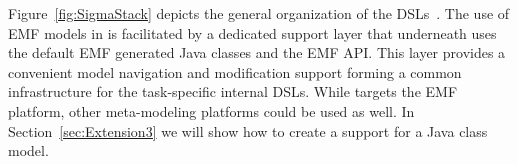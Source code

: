 Figure~\ref{fig:SigmaStack} depicts the general organization of the \SIGMA DSLs~\cite{Krikava2014}.
The use of EMF models in \SIGMA is facilitated by a dedicated support layer that underneath uses the default EMF generated Java classes and the EMF API.
This layer provides a convenient model navigation and modification support forming a common infrastructure for the task-specific internal DSLs.
While \SIGMA targets the EMF platform, other meta-modeling platforms could be used as well.
In Section~\ref{sec:Extension3} we will show how to create a support for a Java class model.